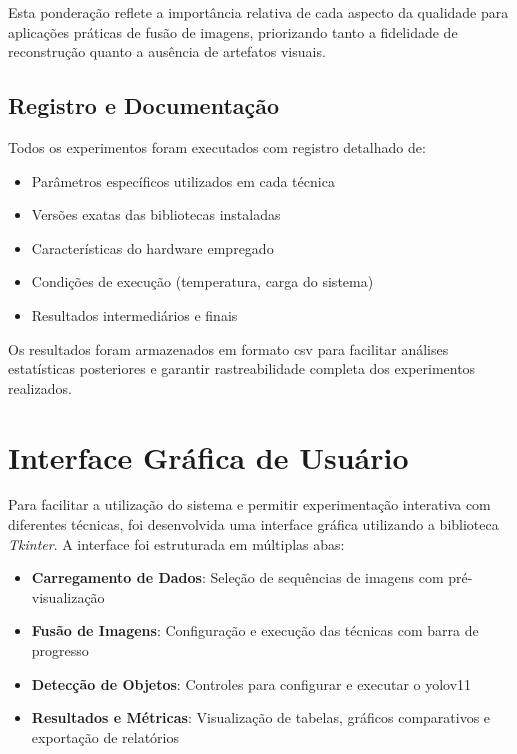 Esta ponderação reflete a importância relativa de cada aspecto da qualidade para aplicações práticas de fusão de imagens, priorizando tanto a fidelidade de reconstrução quanto a ausência de artefatos visuais.

\subsection{Registro e Documentação}

Todos os experimentos foram executados com registro detalhado de:

\begin{itemize}
    \item Parâmetros específicos utilizados em cada técnica
    \item Versões exatas das bibliotecas instaladas
    \item Características do hardware empregado
    \item Condições de execução (temperatura, carga do sistema)
    \item Resultados intermediários e finais
\end{itemize}

Os resultados foram armazenados em formato \gls{csv} para facilitar análises estatísticas posteriores e garantir rastreabilidade completa dos experimentos realizados.

\section{Interface Gráfica de Usuário}

Para facilitar a utilização do sistema e permitir experimentação interativa com diferentes técnicas, foi desenvolvida uma interface gráfica utilizando a biblioteca \textit{Tkinter}. A interface foi estruturada em múltiplas abas:

\begin{itemize}
    \item \textbf{Carregamento de Dados}: Seleção de sequências de imagens com pré-visualização
    \item \textbf{Fusão de Imagens}: Configuração e execução das técnicas com barra de progresso
    \item \textbf{Detecção de Objetos}: Controles para configurar e executar o \gls{yolo}v11
    \item \textbf{Resultados e Métricas}: Visualização de tabelas, gráficos comparativos e exportação de relatórios
\end{itemize}

